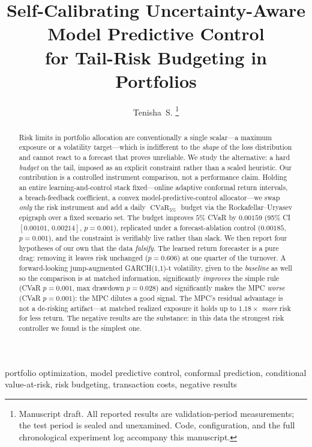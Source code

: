 \documentclass[journal]{IEEEtran}
\DeclareMathOperator{\CVaR}{\mathrm{CVaR}}
\begin{document}
\title{Self-Calibrating Uncertainty-Aware Model Predictive Control\\
for Tail-Risk Budgeting in Portfolios}

\author{Tenisha~S.%
\thanks{Manuscript draft. All reported results are validation-period
measurements; the test period is sealed and unexamined. Code, configuration, and
the full chronological experiment log accompany this manuscript.}}
\maketitle

\begin{abstract}
Risk limits in portfolio allocation are conventionally a single scalar---a
maximum exposure or a volatility target---which is indifferent to the
\emph{shape} of the loss distribution and cannot react to a forecast that proves
unreliable. We study the alternative: a hard \emph{budget} on the tail, imposed as
an explicit constraint rather than a scaled heuristic. Our contribution is a
controlled instrument comparison, not a performance claim. Holding an entire
learning-and-control stack fixed---online adaptive conformal return intervals, a
breach-feedback coefficient, a convex model-predictive-control allocator---we
swap \emph{only} the risk instrument and add a daily $\CVaR_{5\%}$ budget via the
Rockafellar--Uryasev epigraph over a fixed scenario set. The budget improves
$5\%$ CVaR by $0.00159$ (95\% CI $[0.00101,\,0.00214]$, $p=0.001$), replicated
under a forecast-ablation control ($0.00185$, $p=0.001$), and the constraint is
verifiably live rather than slack. We then report four hypotheses of our own that
the data \emph{falsify}. The learned return forecaster is a pure drag: removing it
leaves risk unchanged ($p=0.606$) at one quarter of the turnover. A
forward-looking jump-augmented GARCH(1,1)-t volatility, given to the
\emph{baseline} as well so the comparison is at matched information, significantly
\emph{improves} the simple rule (CVaR $p=0.001$, max drawdown $p=0.028$) and
significantly makes the MPC \emph{worse} (CVaR $p=0.001$): the MPC dilutes a good
signal. The MPC's residual advantage is not a de-risking artifact---at matched
realized exposure it holds up to $1.18\times$ \emph{more} risk for less return.
The negative results are the substance: in this data the strongest risk
controller we found is the simplest one.
\end{abstract}

\begin{IEEEkeywords}
portfolio optimization, model predictive control, conformal prediction,
conditional value-at-risk, risk budgeting, transaction costs, negative results
\end{IEEEkeywords}
\end{document}
